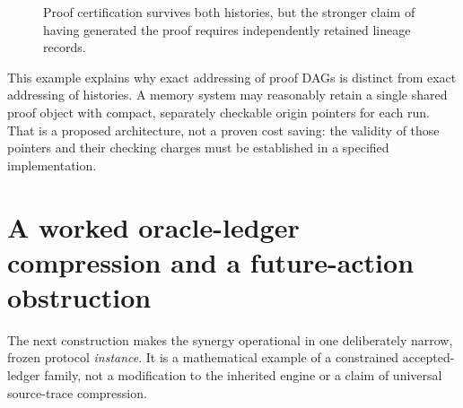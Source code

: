 \documentclass[11pt,letterpaper]{article}
\theoremstyle{definition}
\begin{document}
\begin{figure}[htbp]\centering
{}
\caption{Proof certification survives both histories, but the stronger claim of having generated the proof requires independently retained lineage records.}
\label{fig:origin-split}
\end{figure}

This example explains why exact addressing of proof DAGs is distinct from exact addressing of histories. A memory system may reasonably retain a single shared proof object with compact, separately checkable origin pointers for each run. That is a proposed architecture, not a proven cost saving: the validity of those pointers and their checking charges must be established in a specified implementation.

\section{A worked oracle-ledger compression and a future-action obstruction}\label{sec:worked}
The next construction makes the synergy operational in one deliberately narrow, frozen protocol \emph{instance}. It is a mathematical example of a constrained accepted-ledger family, not a modification to the inherited engine or a claim of universal source-trace compression.
\end{document}

